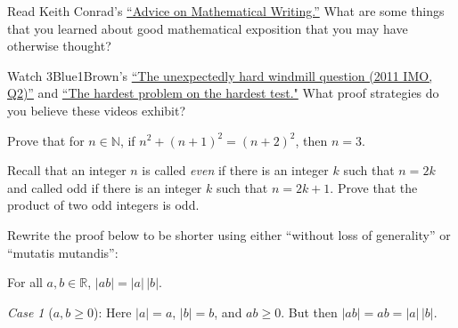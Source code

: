 \documentclass[11pt,letterpaper]{article}
\begin{document}
\homework{}

 Read Keith Conrad's \href{https://kconrad.math.uconn.edu/blurbs/proofs/writingtips.pdf}{``Advice on Mathematical Writing.''} What are some things that you learned about good mathematical exposition that you may have otherwise thought? \pspace





\newpage





 Watch 3Blue1Brown's \href{https://www.youtube.com/watch?v=M64HUIJFTZM}{``The unexpectedly hard windmill question (2011 IMO, Q2)''} and \href{https://www.youtube.com/watch?v=OkmNXy7er84}{``The hardest problem on the hardest test."} What proof strategies do you believe these videos exhibit? \pspace





\newpage





 Prove that for $n \in \mathbb{N}$, if $n^2 + (n + 1)^2= (n + 2)^2$, then $n= 3$. \pspace





\newpage





 Recall that an integer $n$ is called \textit{even} if there is an integer $k$ such that $n= 2k$ and called odd if there is an integer $k$ such that $n= 2k + 1$. Prove that the product of two odd integers is odd. \pspace





\newpage





 Rewrite the proof below to be shorter using either ``without loss of generality'' or ``mutatis mutandis'': \pspace

\begin{thm*}
For all $a, b \in \mathbb{R}$, $|ab|= |a| \, |b|$. 
\end{thm*}

\pf

\textit{Case 1} ($a, b \geq 0$): Here $|a|= a$, $|b|= b$, and $ab \geq 0$. But then $|ab|= ab = |a| \, |b|$. 
\end{document}
